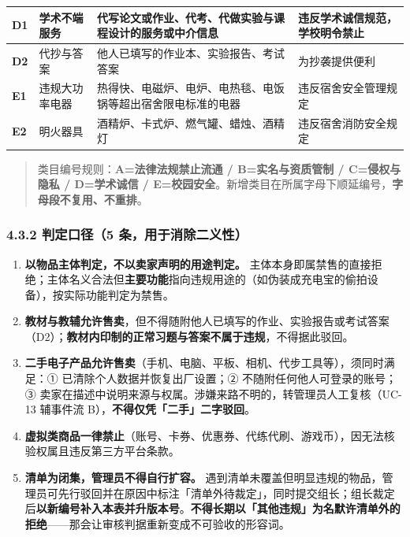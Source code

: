 \documentclass[12pt,a4paper]{ctexart}
\begin{document}
{\begin{longtable}{|p{1.48cm}|p{2.05cm}|p{8.07cm}|p{4.39cm}|}
\hline
\textbf{D1} & 学术不端服务 & 代写论文或作业、代考、代做实验与课程设计的\textbf{服务或中介信息} & 违反学术诚信规范，学校明令禁止 \\
\hline
\textbf{D2} & 代抄与答案 & 他人已填写的作业本、实验报告、考试答案 & 为抄袭提供便利 \\
\hline
\textbf{E1} & 违规大功率电器 & 热得快、电磁炉、电炉、电热毯、电饭锅等超出宿舍限电标准的电器 & 违反宿舍安全管理规定 \\
\hline
\textbf{E2} & 明火器具 & 酒精炉、卡式炉、燃气罐、蜡烛、酒精灯 & 违反宿舍消防安全规定 \\
\hline
\end{longtable}
}


\begin{quote}\small
类目编号规则：\textbf{A=法律法规禁止流通 / B=实名与资质管制 / C=侵权与隐私 / D=学术诚信 / E=校园安全}。新增类目在所属字母下顺延编号，\textbf{字母段不复用、不重排}。

\end{quote}

\subsubsection*{4.3.2 判定口径（5 条，用于消除二义性）}

\begin{enumerate}[leftmargin=1.9em,itemsep=1pt,topsep=2pt]
\item \textbf{以物品主体判定，不以卖家声明的用途判定。} 主体本身即属禁售的直接拒绝；主体名义合法但\textbf{主要功能}指向违规用途的（如伪装成充电宝的偷拍设备），按实际功能判定为禁售。
\item \textbf{教材与教辅允许售卖}，但不得随附他人已填写的作业、实验报告或考试答案（D2）；\textbf{教材内印制的正常习题与答案不属于违规}，不得据此驳回。
\item \textbf{二手电子产品允许售卖}（手机、电脑、平板、相机、代步工具等），须同时满足：① 已清除个人数据并恢复出厂设置；② 不随附任何他人可登录的账号；③ 卖家在描述中说明来源与权属。涉嫌来路不明的，转管理员人工复核（UC-13 辅事件流 B），\textbf{不得仅凭「二手」二字驳回}。
\item \textbf{虚拟类商品一律禁止}（账号、卡券、优惠券、代练代刷、游戏币），因无法核验权属且违反第三方平台条款。
\item \textbf{清单为闭集，管理员不得自行扩容。} 遇到清单未覆盖但明显违规的物品，管理员可先行驳回并在原因中标注「清单外待裁定」，同时提交组长；组长裁定后\textbf{以新编号补入本表并升版本号}。\textbf{不得长期以「其他违规」为名默许清单外的拒绝}——那会让审核判据重新变成不可验收的形容词。
\end{enumerate}
\end{document}
